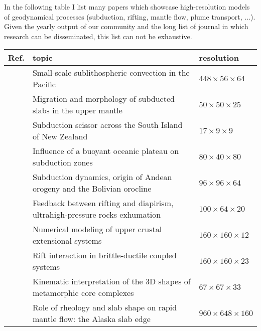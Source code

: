 
In the following table I list many papers which showcase high-resolution models of 
geodynamical processes (subduction, rifting, mantle flow, plume transport, ...).
Given the yearly output of our community and the long list of journal in which 
research can be disseminated, this list can not be exhaustive.

\noindent
{\small
\begin{tabular}{lll}
\hline
Ref.     & topic   & resolution \\
\hline
\hline
\cite{baiv10} & Small-scale sublithospheric convection in the Pacific                           & $448\times56\times64$ \\ 
\cite{stsf10} & Migration and morphology of subducted slabs in the upper mantle                 & $50\times50\times25$ \\
\cite{pyeg10} & Subduction scissor across the South Island of New Zealand                       & $17\times9\times9$ \\
\cite{mamb10} & Influence of a buoyant oceanic plateau on subduction zones                      & $80\times 40 \times80$ \\%
\cite{cafz11} & Subduction dynamics, origin of Andean orogeny and the Bolivian orocline         & $96\times96\times64$ \\%
\cite{ellw11} & Feedback between rifting and diapirism, ultrahigh-pressure rocks exhumation     & $100\times64\times20$ \\%
\cite{alht11} & Numerical modeling of upper crustal extensional systems                         & $160\times160\times12$ \\%
\cite{alht12} & Rift interaction in brittle-ductile coupled systems                             & $160\times160\times23$ \\%
\cite{lehm12} & Kinematic interpretation of the 3D shapes of metamorphic core complexes         & $67\times67\times33$ \\%
\cite{jabi12} & Role of rheology and slab shape on rapid mantle flow: the Alaska slab edge      & $960\times648\times160$ \\%

\end{tabular}}
